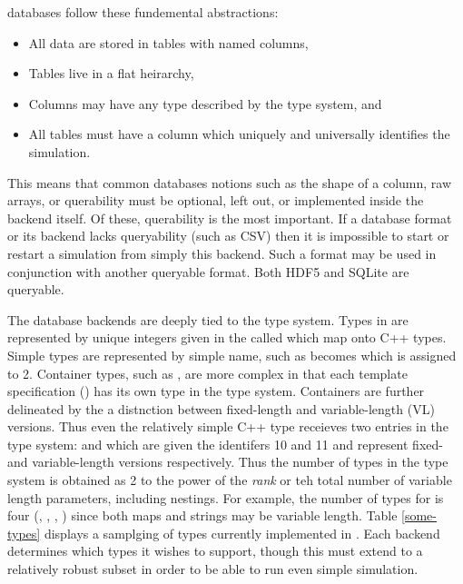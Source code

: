 \Cyclus databases follow these fundemental abstractions:
\begin{itemize}
    \item All data are stored in tables with named columns,
    \item Tables live in a flat heirarchy,
    \item Columns may have any type described by the \cyclus type system, and
    \item All tables must have a  column which uniquely and 
          universally identifies the simulation.
\end{itemize}
This means that common databases notions such as the shape of a column, raw arrays, or
querability must be optional, left out, or implemented inside the backend itself.
Of these, querability is the most important. If a database format or its backend lacks 
queryability (such as CSV) then it is impossible to start or restart a 
\cyclus simulation from simply this backend.  Such a format may be used in 
conjunction with another queryable format. Both HDF5 and SQLite are queryable.

The database backends are deeply tied to the \cyclus type system. Types in \cyclus
are represented by unique integers given in the  called 
which map onto C++ types.
Simple types are represented by simple name, such as  becomes
 which is assigned to 2. Container types, such as ,
are more complex in that each template specification () has
its own type in the \cyclus type system.  Containers are further delineated by the 
a distnction between fixed-length and variable-length (VL) versions. Thus even the 
relatively simple C++ type  receieves two entries in the 
\cyclus type system:  and  which are given 
the identifers 10 and 11 and represent fixed- and variable-length versions 
respectively.  Thus the number of types in the \cyclus type system is obtained as 
2 to the power of the \emph{rank} or teh total number of variable length parameters, 
including nestings.
For example, the number of \cyclus types for  is 
four (, , , 
) since both maps and strings may be variable length.
Table \ref{some-types} displays a samplging of types currently implemented in 
\cyclus.
Each backend determines which types it wishes to support, though this must extend 
to a relatively robust subset in order to be able to run even simple simulation.

